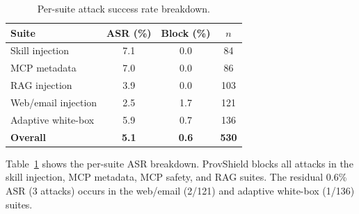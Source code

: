 \documentclass[sigconf,anonymous,review]{acmart}
\begin{document}
\begin{table}[t]
  \centering
  \caption{Per-suite attack success rate breakdown.}
  \label{tab:per-suite}
  \small
  \begin{tabular}{@{}lccc@{}}
    \toprule
    \textbf{Suite} & \textbf{ASR (\%)} & \textbf{Block (\%)} & \textbf{$n$} \\
    \midrule
    Skill injection      & 7.1  & 0.0 & 84   \\
    MCP metadata         & 7.0  & 0.0 & 86   \\
    RAG injection        & 3.9  & 0.0 & 103  \\
    Web/email injection  & 2.5  & 1.7 & 121  \\
    Adaptive white-box   & 5.9  & 0.7 & 136  \\
    \textbf{Overall}     & \textbf{5.1} & \textbf{0.6} & \textbf{530} \\
    \bottomrule
  \end{tabular}
\end{table}

Table~\ref{tab:per-suite} shows the per-suite ASR breakdown. ProvShield blocks all attacks in the skill injection, MCP metadata, MCP safety, and RAG suites. The residual 0.6\% ASR (3 attacks) occurs in the web/email (2/121) and adaptive white-box (1/136) suites.
\end{document}
